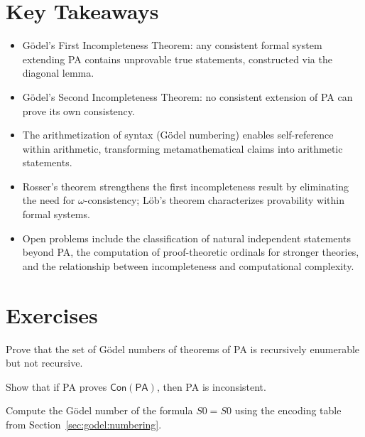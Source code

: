\section*{Key Takeaways}
\begin{itemize}
\item Gödel's First Incompleteness Theorem: any consistent formal system extending PA contains unprovable true statements, constructed via the diagonal lemma.
\item Gödel's Second Incompleteness Theorem: no consistent extension of PA can prove its own consistency.
\item The arithmetization of syntax (Gödel numbering) enables self-reference within arithmetic, transforming metamathematical claims into arithmetic statements.
\item Rosser's theorem strengthens the first incompleteness result by eliminating the need for $\omega$-consistency; Löb's theorem characterizes provability within formal systems.
\item Open problems include the classification of natural independent statements beyond PA, the computation of proof-theoretic ordinals for stronger theories, and the relationship between incompleteness and computational complexity.
\end{itemize}

\section{Exercises}
\label{sec:godel:exercises}

\begin{exercise}[Basic]
Prove that the set of Gödel numbers of theorems of PA is recursively enumerable but not recursive.
\end{exercise}

\begin{exercise}[Basic]
Show that if PA proves $\mathsf{Con}(\mathsf{PA})$, then PA is inconsistent.
\end{exercise}

\begin{exercise}[Basic]
Compute the Gödel number of the formula $S0 = S0$ using the encoding table from Section~\ref{sec:godel:numbering}.
\end{exercise}

